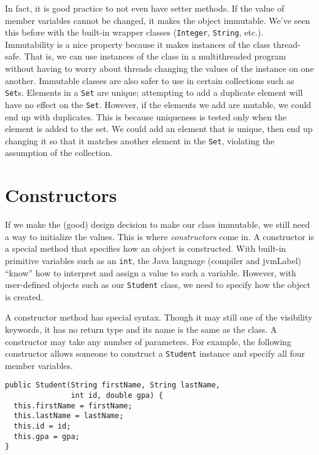 In fact, it is good practice to not even have setter methods.  If 
the value of member variables cannot be changed, it makes the object
\gls{immutable}.  We've seen this before with the built-in wrapper
classes (\texttt{Integer}, \texttt{String}, etc.).
Immutability is a nice property because it makes instances of the
class thread-safe.  That is, we can use instances of the class in a 
multithreaded program without having to worry about threads changing
the values of the instance on one another.  Immutable classes are also
safer to use in certain collections such as \texttt{Set}s.
Elements in a \texttt{Set} are unique; attempting to 
add a duplicate element will have no effect on the \texttt{Set}.
However, if the elements we add are mutable, we could end up
with duplicates.  This is because uniqueness is tested only when the
element is added to the set.  We could add an element that is unique,
then end up changing it so that it matches another element in the
\texttt{Set}, violating the assumption of the collection.

\section{Constructors}

If we make the (good) design decision to make our class immutable,
we still need a way to initialize the values.  This is where 
\emph{constructors} come in.  A constructor is a special method
that specifies how an object is constructed.  With built-in primitive
variables such as an \texttt{int}, the Java language
(compiler and \gls{jvmLabel}) ``know'' how to interpret and
assign a value to such a variable.  However, with user-defined
objects such as our \texttt{Student} class, we need
to specify how the object is created.

A constructor method has special syntax.  Though it may still 
one of the visibility keywords, it has no return type and its
name is the same as the class.  A constructor may take any
number of parameters.  For example, the following constructor
allows someone to construct a \texttt{Student} instance
and specify all four member variables.

\begin{verbatim}
public Student(String firstName, String lastName, 
               int id, double gpa) {
  this.firstName = firstName;
  this.lastName = lastName;
  this.id = id;
  this.gpa = gpa;
}
\end{verbatim}

